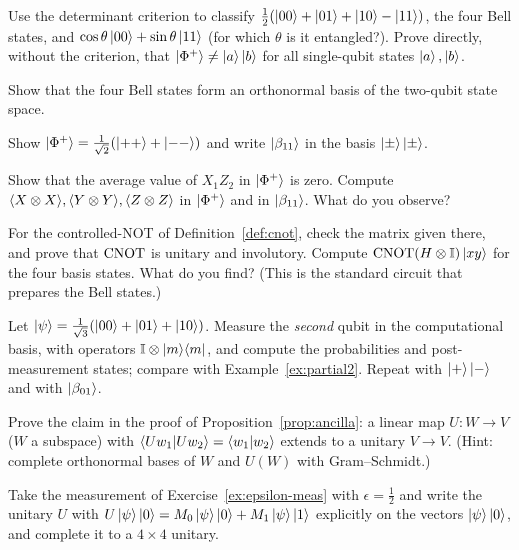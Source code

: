 \begin{exerciseset}
   Use the determinant criterion to classify $\frac12(\left|00\right\rangle+\left|01\right\rangle+\left|10\right\rangle-\left|11\right\rangle)$, the four Bell states, and $\cos\theta\left|00\right\rangle+\sin\theta\left|11\right\rangle$ (for which $\theta$ is it entangled?). Prove directly, without the criterion, that $\left|\Phi^+\right\rangle\neq\left|a\right\rangle\left|b\right\rangle$ for all single-qubit states $\left|a\right\rangle,\left|b\right\rangle$.

   Show that the four Bell states form an orthonormal basis of the two-qubit state space.\label{ex:bell-basis}

   Show $\left|\Phi^+\right\rangle=\frac1{\sqrt2}(\left|++\right\rangle+\left|--\right\rangle)$ and write $\left|\beta_{11}\right\rangle$ in the basis $\left|\pm\right\rangle\left|\pm\right\rangle$.\label{ex:phiplus-pm}

   Show that the average value of $X_1Z_2$ in $\left|\Phi^+\right\rangle$ is zero. Compute $\langle X\otimes X\rangle,\langle Y\otimes Y\rangle,\langle Z\otimes Z\rangle$ in $\left|\Phi^+\right\rangle$ and in $\left|\beta_{11}\right\rangle$. What do you observe?

  \label{ex:cnot} For the controlled-NOT of Definition~\ref{def:cnot}, check the matrix given there, and prove that $\mathrm{CNOT}$ is unitary and involutory. Compute $\mathrm{CNOT}(H\otimes\mathbb{I})\left|xy\right\rangle$ for the four basis states. What do you find? (This is the standard circuit that prepares the Bell states.)

   Let $\left|\psi\right\rangle=\frac1{\sqrt3}(\left|00\right\rangle+\left|01\right\rangle+\left|10\right\rangle)$. Measure the \emph{second} qubit in the computational basis, with operators $\mathbb{I}\otimes\left|m\right\rangle\!\left\langle m\right|$, and compute the probabilities and post-measurement states; compare with Example~\ref{ex:partial2}. Repeat with $\left|+\right\rangle\left|-\right\rangle$ and with $\left|\beta_{01}\right\rangle$.

  \label{ex:extend-unitary} Prove the claim in the proof of Proposition~\ref{prop:ancilla}: a linear map $U:W\to V$ ($W$ a subspace) with $\left\langle Uw_1\middle|Uw_2\right\rangle=\left\langle w_1\middle|w_2\right\rangle$ extends to a unitary $V\to V$. (Hint: complete orthonormal bases of $W$ and $U(W)$ with Gram--Schmidt.)

   Take the measurement of Exercise~\ref{ex:epsilon-meas} with $\epsilon=\frac12$ and write the unitary $U$ with $U\left|\psi\right\rangle\left|0\right\rangle=M_0\left|\psi\right\rangle\left|0\right\rangle+M_1\left|\psi\right\rangle\left|1\right\rangle$ explicitly on the vectors $\left|\psi\right\rangle\left|0\right\rangle$, and complete it to a $4\times4$ unitary.
\end{exerciseset}
